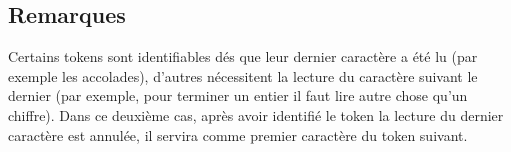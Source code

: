 \documentclass[a4paper,12pt]{article}
\begin{document}
	\subsection{Remarques}
		Certains tokens sont identifiables dés que leur dernier caractère a été lu (par exemple les accolades), 
		d'autres nécessitent la lecture du caractère suivant le dernier (par exemple, pour terminer un entier il faut lire autre chose qu'un chiffre).
		Dans ce deuxième cas, après avoir identifié le token la lecture du dernier caractère est annulée, il servira comme premier caractère du token suivant.
\end{document}
